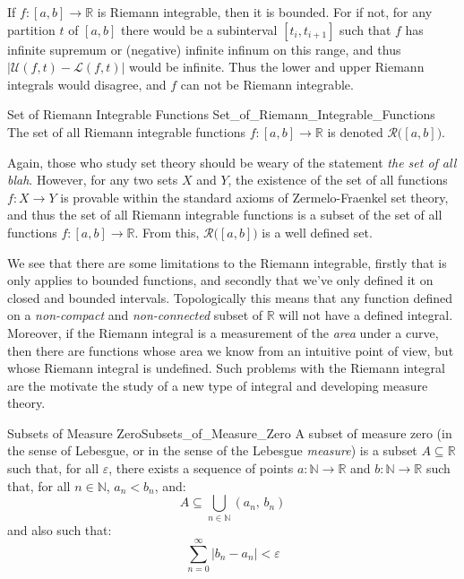 \documentclass[crop=false,class=article]{standalone}                           %
\begin{document}
        If $f:[a,b]\rightarrow\mathbb{R}$ is Riemann integrable, then it
        is bounded. For if not, for any partition $t$ of $[a,b]$ there would
        be a subinterval $[t_{i},t_{i+1}]$ such that $f$ has infinite
        supremum or (negative) infinite infinum on this range, and thus
        $|\mathcal{U}(f,t)-\mathcal{L}(f,t)|$ would be infinite. Thus the
        lower and upper Riemann integrals would disagree, and $f$ can not
        be Riemann integrable.
        \begin{fnotation}{Set of Riemann Integrable Functions}
                         {Set_of_Riemann_Integrable_Functions}
            The set of all Riemann integrable functions
            $f:[a,b]\rightarrow\mathbb{R}$ is denoted
            $\mathcal{R}\big([a,b]\big)$.
        \end{fnotation}
        Again, those who study set theory should be weary of the statement
        \textit{the set of all blah}. However, for any two sets $X$ and $Y$,
        the existence of the set of all functions $f:X\rightarrow{Y}$ is
        provable within the standard axioms of Zermelo-Fraenkel set theory,
        and thus the set of all Riemann integrable functions is a subset of
        the set of all functions $f:[a,b]\rightarrow\mathbb{R}$. From this,
        $\mathcal{R}\big([a,b]\big)$ is a well defined set.
        \par\hfill\par
        We see that there are some limitations to the Riemann integrable,
        firstly that is only applies to bounded functions, and secondly
        that we've only defined it on closed and bounded intervals.
        Topologically this means that any function defined on a
        \textit{non-compact} and \textit{non-connected} subset of
        $\mathbb{R}$ will not have a defined integral. Moreover, if
        the Riemann integral is a measurement of the \textit{area} under a
        curve, then there are functions whose area we know from an intuitive
        point of view, but whose Riemann integral is undefined. Such problems
        with the Riemann integral are the motivate the study of a new
        type of integral and developing measure theory.
        \begin{fdefinition}{Subsets of Measure Zero}{Subsets_of_Measure_Zero}
            A subset of measure zero (in the sense of Lebesgue, or in the
            sense of the Lebesgue \textit{measure}) is a subset
            $A\subseteq\mathbb{R}$ such that, for all $\varepsilon$, there
            exists a sequence of points $a:\mathbb{N}\rightarrow\mathbb{R}$
            and $b:\mathbb{N}\rightarrow\mathbb{R}$ such that, for all
            $n\in\mathbb{N}$, $a_{n}<b_{n}$, and:
            \begin{equation}
                A\subseteq\bigcup_{n\in\mathbb{N}}(a_{n},\,b_{n})
            \end{equation}
            and also such that:
            \begin{equation}
                \sum_{n=0}^{\infty}|b_{n}-a_{n}|<\varepsilon
            \end{equation}
        \end{fdefinition}
\end{document}
